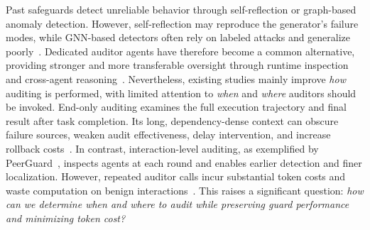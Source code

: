 \documentclass[letterpaper]{article} %
\begin{document}


Past safeguards detect unreliable behavior through self-reflection or graph-based anomaly detection. However, self-reflection may reproduce the generator's failure modes, while GNN-based detectors often rely on labeled attacks and generalize poorly~\cite{shinn2023reflexion,renze2024selfreflection,wang2025gsafeguard,miao2025blindguard}. Dedicated auditor agents have therefore become a common alternative, providing stronger and more transferable oversight through runtime inspection and cross-agent reasoning~\cite{xiang2024guardagent,wang2026trinityguard,fan2025peerguard,du2024multiagentdebate}. Nevertheless, existing studies mainly improve \emph{how} auditing is performed, with limited attention to \emph{when} and \emph{where} auditors should be invoked. End-only auditing examines the full execution trajectory and final result after task completion. Its long, dependency-dense context can obscure failure sources, weaken audit effectiveness, delay intervention, and increase rollback costs~\cite{liu-etal-2024-lost,yang2026agentauditor}. In contrast, interaction-level auditing, as exemplified by PeerGuard~\cite{fan2025peerguard}, inspects agents at each round and enables earlier detection and finer localization. However, repeated auditor calls incur substantial token costs and waste computation on benign interactions~\cite{du2024multiagentdebate}. This raises a significant question: \emph{how can we determine when and where to audit while preserving guard performance and minimizing token cost?}
\end{document}
